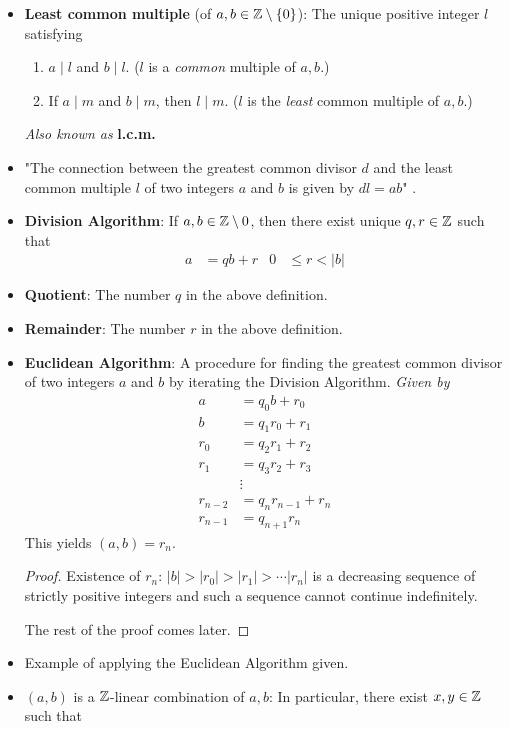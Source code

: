 \documentclass[../notes.tex]{subfiles}
\begin{document}
\begin{itemize}
    \item \textbf{Least common multiple} (of $a,b\in\mathbb{Z}\setminus\{0\}$): The unique positive integer $l$ satisfying
    \begin{enumerate}
        \item $a\mid l$ and $b\mid l$. ($l$ is a \emph{common} multiple of $a,b$.)
        \item If $a\mid m$ and $b\mid m$, then $l\mid m$. ($l$ is the \emph{least} common multiple of $a,b$.)
    \end{enumerate}
    \emph{Also known as} \textbf{l.c.m.}
    \item "The connection between the greatest common divisor $d$ and the least common multiple $l$ of two integers $a$ and $b$ is given by $dl=ab$" \parencite[4]{bib:DummitFoote}.
    \item \textbf{Division Algorithm}: If $a,b\in\mathbb{Z}\setminus 0$, then there exist unique $q,r\in\mathbb{Z}$ such that
    \begin{align*}
        a &= qb+r&
        0 &\leq r < |b|
    \end{align*}
    \item \textbf{Quotient}: The number $q$ in the above definition.
    \item \textbf{Remainder}: The number $r$ in the above definition.
    \item \textbf{Euclidean Algorithm}: A procedure for finding the greatest common divisor of two integers $a$ and $b$ by iterating the Division Algorithm. \emph{Given by}
    \begin{align*}
        a &= q_0b+r_0\\
        b &= q_1r_0+r_1\\
        r_0 &= q_2r_1+r_2\\
        r_1 &= q_3r_2+r_3\\
        &\vdots\\
        r_{n-2} &= q_nr_{n-1}+r_n\\
        r_{n-1} &= q_{n+1}r_n
    \end{align*}
    This yields $(a,b)=r_n$.
    \begin{proof}
        Existence of $r_n$: $|b|>|r_0|>|r_1|>\cdots|r_n|$ is a decreasing sequence of strictly positive integers and such a sequence cannot continue indefinitely.\par
        The rest of the proof comes later.
    \end{proof}
    \item Example of applying the Euclidean Algorithm given.
    \item $(a,b)$ is a $\mathbb{Z}$-linear combination of $a,b$: In particular, there exist $x,y\in\mathbb{Z}$ such that

\end{itemize}
\end{document}

